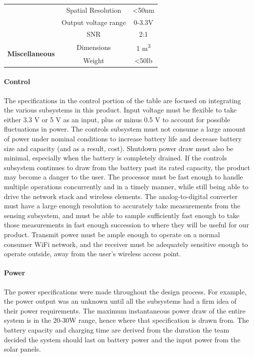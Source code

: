 \begin{table}[H]
\begin{tabular}{c|c|c}
                                        & Spatial Resolution & \textless50nm \\\cline{2-3}
                                        & Output voltage range & 0-3.3V \\\cline{2-3}
                                        & SNR & 2:1 \\\cline{2-3}
        \hline
        \multirow{2}{*}{\textbf{Miscellaneous}} & Dimensions & 1 m\textsuperscript{3} \\\cline{2-3}
                                                & Weight & \textless 50lb \\
        \hline
    \end{tabular}
    \label{table:eng-specs}
\end{table}
\paragraph{Control}
The specifications in the control portion of the table are focused on integrating the various subsystems in this product. Input voltage must be flexible to take either 3.3 V or 5 V as an input, plus or minus 0.5 V to account for possible fluctuations in power. The controls subsystem must not consume a large amount of power under nominal conditions to increase battery life and decrease battery size and capacity (and as a result, cost). Shutdown power draw must also be minimal, especially when the battery is completely drained. If the controls subsystem continues to draw from the battery past its rated capacity, the product may become a danger to the user. The processor must be fast enough to handle multiple operations concurrently and in a timely manner, while still being able to drive the network stack and wireless elements. The analog-to-digital converter must have a large enough resolution to accurately take measurements from the sensing subsystem, and must be able to sample sufficiently fast enough to take those measurements in fast enough succession to where they will be useful for our product. Transmit power must be ample enough to operate on a normal consumer WiFi network, and the receiver must be adequately sensitive enough to operate outside, away from the user's wireless access point.

\paragraph{Power}
The power specifications were made throughout the design process. For example, the power output was an unknown until all the subsystems had a firm idea of their power requirements. The maximum instantaneous power draw of the entire system is in the 20-30W range, hence where that specification is drawn from. The battery capacity and charging time are derived from the duration the team decided the system should last on battery power and the input power from the solar panels.

